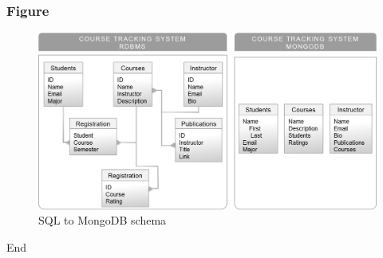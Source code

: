\documentclass{beamer}
\begin{document}

\begin{frame}
\frametitle{Figure}
\begin{figure}
\includegraphics[width=0.8\linewidth]{01_mongodb_courses.png}
\caption{SQL to MongoDB schema}
\end{figure}
\end{frame}





\begin{frame}
\Huge{\centerline{End}}
\end{frame}

\end{document}
